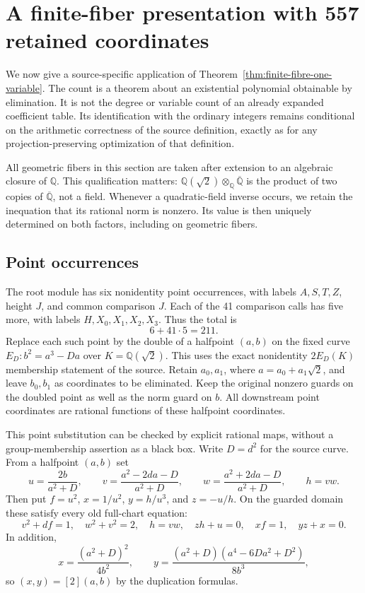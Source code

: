 
\section{A finite-fiber presentation with 557 retained coordinates}
\label{sec:finite-fibre-application}

We now give a source-specific application of
Theorem~\ref{thm:finite-fibre-one-variable}.  The count is a theorem
about an existential polynomial obtainable by elimination.  It is not
the degree or variable count of an already expanded coefficient table.
Its identification with the ordinary integers remains conditional on
the arithmetic correctness of the source definition, exactly as for
any projection-preserving optimization of that definition.

All geometric fibers in this section are taken after extension to an
algebraic closure of $\mathbb Q$.  This qualification matters:
$\mathbb Q(\sqrt2)\otimes_{\mathbb Q}\overline{\mathbb Q}$ is the
product of two copies of $\overline{\mathbb Q}$, not a field.
Whenever a quadratic-field inverse occurs, we retain the inequation
that its rational norm is nonzero.  Its value is then uniquely determined
on both factors, including on geometric fibers.

\subsection{Point occurrences}

The root module has six nonidentity point occurrences, with labels
$A,S,T,Z$, height $J$, and common comparison $J$.  Each of the 41
comparison calls has five more, with labels $H,X_0,X_1,X_2,X_3$.
Thus the total is
\[
 6+41\cdot5=211.
\]
Replace each such point by the double of a halfpoint $(a,b)$ on
the fixed curve $E_D:b^2=a^3-Da$ over $K=\mathbb Q(\sqrt2)$.
This uses the exact nonidentity $2E_D(K)$ membership statement of the
source.  Retain $a_0,a_1$, where $a=a_0+a_1\sqrt2$, and leave
$b_0,b_1$ as coordinates to be eliminated.  Keep the original
nonzero guards on the doubled point as well as the norm guard on $b$.
All downstream point coordinates are rational functions of these
halfpoint coordinates.

This point substitution can be checked by explicit rational maps,
without a group-membership assertion as a black box.  Write $D=d^2$
for the source curve.  From a halfpoint $(a,b)$ set
\[
 u=\frac{2b}{a^2+D},\qquad
 v=\frac{a^2-2da-D}{a^2+D},\qquad
 w=\frac{a^2+2da-D}{a^2+D},\qquad h=vw.
\]
Then put $f=u^2$, $x=1/u^2$, $y=h/u^3$, and $z=-u/h$.
On the guarded domain these satisfy every old full-chart equation:
\[
 v^2+df=1,\quad w^2+v^2=2,\quad h=vw,\quad
 zh+u=0,\quad xf=1,\quad yz+x=0.
\]
In addition,
\[
 x=\frac{(a^2+D)^2}{4b^2},\qquad
 y=\frac{(a^2+D)(a^4-6Da^2+D^2)}{8b^3},
\]
so $(x,y)=[2](a,b)$ by the duplication formulas.

